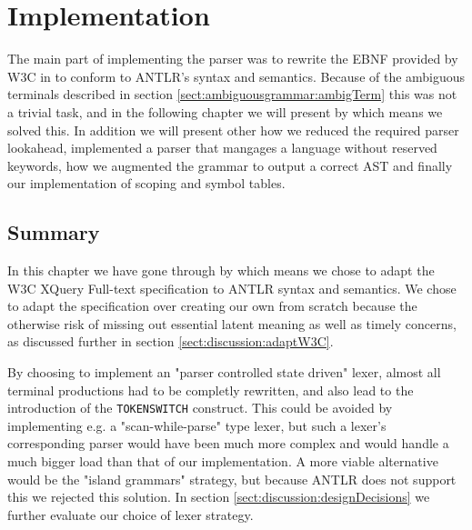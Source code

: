 \chapter{Implementation}
\label{chapter:implementation}

The main part of implementing the parser was to rewrite the EBNF provided by W3C in \cite{w3c01} to conform to ANTLR's syntax and semantics. Because of the ambiguous terminals described in section \ref{sect:ambiguousgrammar:ambigTerm} this was not a trivial task, and in the following chapter we will present by which means we solved this. In addition we will present other how we reduced the required parser lookahead, implemented a parser that mangages a language without reserved keywords, how we augmented the grammar to output a correct AST and finally our implementation of scoping and symbol tables.















\section{Summary}
In this chapter we have gone through by which means we chose to adapt the W3C
XQuery Full-text specification to ANTLR syntax and semantics. We chose to adapt
the specification over creating our own from scratch because the otherwise risk
of missing out essential latent meaning as well as timely concerns, as
discussed further in section \ref{sect:discussion:adaptW3C}.    

By choosing to implement an "parser controlled state driven" lexer, almost all terminal productions
had to be completly rewritten, and also lead to the introduction of the
\verb!TOKENSWITCH! construct. This could be avoided by implementing e.g. a
"scan-while-parse" type lexer, but such a lexer's corresponding parser would
have been much more complex and would handle a much bigger load than that of
our implementation. A more viable alternative would be the "island grammars"
strategy, but because ANTLR does not support this we rejected this solution. In
section \ref{sect:discussion:designDecisions} we further evaluate our choice of
lexer strategy.

